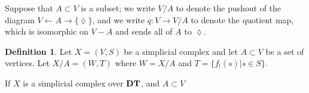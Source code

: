 \documentclass{amsart}
\def\to{\rightarrow}
\def\from{\leftarrow}
\def\taking{\colon}
\def\ss{\subset}
\theoremstyle{remark}
\theoremstyle{definition}
\newtheorem{definition}[theorem]{Definition}
\def\DT{{\bf DT}}
\begin{document}
Suppose that $A\ss V$ is a subset; we write $V/A$ to denote the pushout of the diagram $V\from A\to\{\lozenge\}$, and we write  $q\taking V\to V/A$ to denote the quotient map, which is isomorphic on $V-A$ and sends all of $A$ to $\lozenge$.

\begin{definition}

Let $X=(V,S)$ be a simplicial complex and let $A\ss V$ be a set of vertices.  Let $X/A=(W,T)$ where $W=X/A$ and $T=\{f_!(s)|s\in S\}$.  

If $X$ is a simplicial complex over $\DT$, and $A\ss V$

\end{definition}
\end{document}
